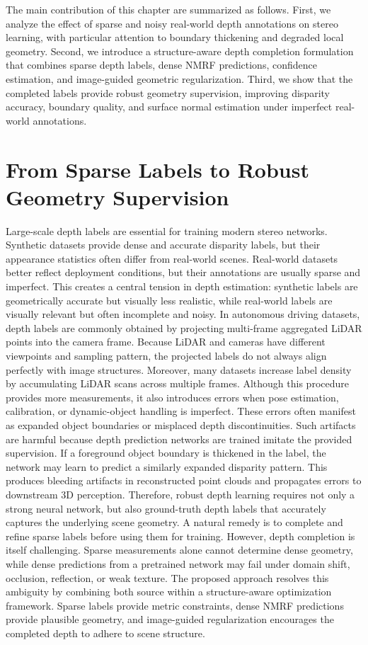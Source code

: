 The main contribution of this chapter are summarized as follows.
First, we analyze the effect of sparse and noisy real-world depth annotations on stereo learning, with particular attention to boundary thickening and degraded local geometry.
Second, we introduce a structure-aware depth completion formulation that combines sparse depth labels, dense NMRF predictions, confidence estimation, and image-guided geometric regularization.
Third, we show that the completed labels provide robust geometry supervision, improving disparity accuracy, boundary quality, and surface normal estimation under imperfect real-world annotations.

\section{From Sparse Labels to Robust Geometry Supervision}
Large-scale depth labels are essential for training modern stereo networks.
Synthetic datasets provide dense and accurate disparity labels, but their appearance statistics often differ from real-world scenes.
Real-world datasets better reflect deployment conditions, but their annotations are usually sparse and imperfect.
This creates a central tension in depth estimation: synthetic labels are geometrically accurate but visually less realistic, while real-world labels are visually relevant but often incomplete and noisy.
In autonomous driving datasets, depth labels are commonly obtained by projecting multi-frame aggregated LiDAR points into the camera frame.
Because LiDAR and cameras have different viewpoints and sampling pattern, the projected labels do not always align perfectly with image structures.
Moreover, many datasets increase label density by accumulating LiDAR scans across multiple frames.
Although this procedure provides more measurements, it also introduces errors when pose estimation, calibration, or dynamic-object handling is imperfect.
These errors often manifest as expanded object boundaries or misplaced depth discontinuities.
Such artifacts are harmful because depth prediction networks are trained imitate the provided supervision.
If a foreground object boundary is thickened in the label, the network may learn to predict a similarly expanded disparity pattern.
This produces bleeding artifacts in reconstructed point clouds and propagates errors to downstream 3D perception.
Therefore, robust depth learning requires not only a strong neural network, but also ground-truth depth labels that accurately captures the underlying scene geometry.
A natural remedy is to complete and refine sparse labels before using them for training.
However, depth completion is itself challenging.
Sparse measurements alone cannot determine dense geometry, while dense predictions from a pretrained network may fail under domain shift, occlusion, reflection, or weak texture.
The proposed approach resolves this ambiguity by combining both source within a structure-aware optimization framework.
Sparse labels provide metric constraints, dense NMRF predictions provide plausible geometry, and image-guided regularization encourages the completed depth to adhere to scene structure.

